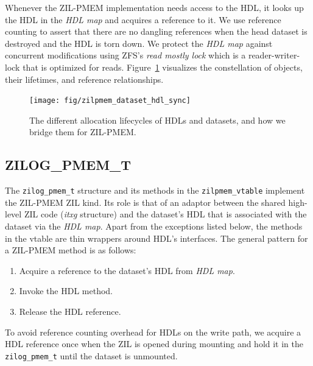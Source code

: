 \documentclass[12pt,a4paper,twoside]{book}
\begin{document}
Whenever the ZIL-PMEM implementation needs access to the HDL, it looks up the HDL in the \textit{HDL map} and acquires a reference to it.
We use reference counting to assert that there are no dangling references when the head dataset is destroyed and the HDL is torn down.
We protect the \textit{HDL map} against concurrent modifications using ZFS's \textit{read mostly lock} which is a reader-writer-lock that is optimized for reads.
Figure~\ref{fig:zilpmem:datasethdlsync} visualizes the constellation of objects, their lifetimes, and reference relationships.

\begin{figure}[H]
    \centering
    \texttt{[image: fig/zilpmem\_dataset\_hdl\_sync]}
    \caption{The different allocation lifecycles of HDLs and datasets, and how we bridge them for ZIL-PMEM.}
    \label{fig:zilpmem:datasethdlsync}
\end{figure}

\subsection{ZILOG\_PMEM\_T}\label{sec:zilpmem:zilog}
The \lstinline{zilog_pmem_t} structure and its methods in the \lstinline{zilpmem_vtable} implement the ZIL-PMEM ZIL kind.
Its role is that of an adaptor between the shared high-level ZIL code (\textit{itxg} structure) and the dataset's HDL that is associated with the dataset via the \textit{HDL map}.
Apart from the exceptions listed below, the methods in the vtable are thin wrappers around HDL's interfaces.
The general pattern for a ZIL-PMEM method is as follows:
\begin{enumerate}[noitemsep]
    \item Acquire a reference to the dataset's HDL from \textit{HDL map}.
    \item Invoke the HDL method.
    \item Release the HDL reference.
\end{enumerate}
To avoid reference counting overhead for HDLs on the write path, we acquire a HDL reference once when the ZIL is opened during mounting and hold it in the \lstinline{zilog_pmem_t} until the dataset is unmounted.
\end{document}
